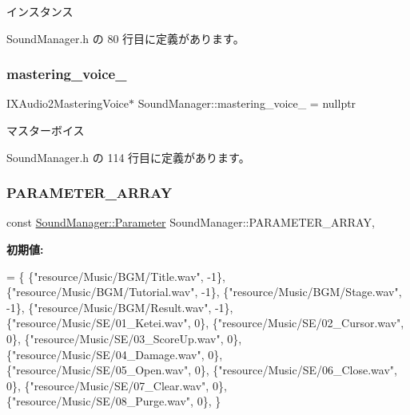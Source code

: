 インスタンス 



 Sound\+Manager.\+h の 80 行目に定義があります。

\mbox{\label{class_sound_manager_a96f7bde6fb880cb242434707cd769e64}} 
\subsubsection{\texorpdfstring{mastering\+\_\+voice\+\_\+}{mastering\_voice\_}}
{\footnotesize\ttfamily I\+X\+Audio2\+Mastering\+Voice$\ast$ Sound\+Manager\+::mastering\+\_\+voice\+\_\+ = nullptr\hspace{0.3cm}{\ttfamily [private]}}



マスターボイス 



 Sound\+Manager.\+h の 114 行目に定義があります。

\mbox{\label{class_sound_manager_aaa51d88b702313608c25be96945d7bc6}} 
\subsubsection{\texorpdfstring{P\+A\+R\+A\+M\+E\+T\+E\+R\+\_\+\+A\+R\+R\+AY}{PARAMETER\_ARRAY}}
{\footnotesize\ttfamily const \mbox{\hyperlink{struct_sound_manager_1_1_parameter}{Sound\+Manager\+::\+Parameter}} Sound\+Manager\+::\+P\+A\+R\+A\+M\+E\+T\+E\+R\+\_\+\+A\+R\+R\+AY\hspace{0.3cm}{\ttfamily [static]}, {\ttfamily [private]}}

{\bfseries 初期値\+:}
\begin{DoxyCode}
=
\{
    \{\textcolor{stringliteral}{"resource/Music/BGM/Title.wav"}, -1\},
    \{\textcolor{stringliteral}{"resource/Music/BGM/Tutorial.wav"}, -1\},
    \{\textcolor{stringliteral}{"resource/Music/BGM/Stage.wav"}, -1\},
    \{\textcolor{stringliteral}{"resource/Music/BGM/Result.wav"}, -1\},
    \{\textcolor{stringliteral}{"resource/Music/SE/01\_Ketei.wav"}, 0\},
    \{\textcolor{stringliteral}{"resource/Music/SE/02\_Cursor.wav"}, 0\},
    \{\textcolor{stringliteral}{"resource/Music/SE/03\_ScoreUp.wav"}, 0\},
    \{\textcolor{stringliteral}{"resource/Music/SE/04\_Damage.wav"}, 0\},
    \{\textcolor{stringliteral}{"resource/Music/SE/05\_Open.wav"}, 0\},
    \{\textcolor{stringliteral}{"resource/Music/SE/06\_Close.wav"}, 0\},
    \{\textcolor{stringliteral}{"resource/Music/SE/07\_Clear.wav"}, 0\},
    \{\textcolor{stringliteral}{"resource/Music/SE/08\_Purge.wav"}, 0\},
\}
\end{DoxyCode}


